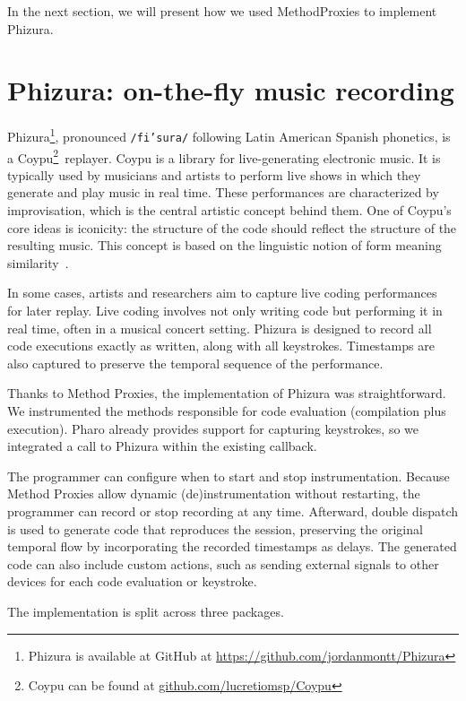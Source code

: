 \documentclass[
]{ceurart}
\begin{document}
In the next section, we will present how we used MethodProxies to implement Phizura.

\section{Phizura: on-the-fly music recording}

Phizura\footnote{Phizura is available at GitHub at \url{https://github.com/jordanmontt/Phizura}}, pronounced \texttt{/fi'su\*ra/} following Latin American Spanish phonetics, is a Coypu\footnote{Coypu can be found at \url{github.com/lucretiomsp/Coypu}}\ replayer.
Coypu is a library for live-generating electronic music.
It is typically used by musicians and artists to perform live shows in which they generate and play music in real time.
These performances are characterized by improvisation, which is the central artistic concept behind them.
One of Coypu's core ideas is iconicity: the structure of the code should reflect the structure of the resulting music.
This concept is based on the linguistic notion of form meaning similarity~\cite{Haim85a, Comr81a}.

In some cases, artists and researchers aim to capture live coding performances~\cite{Nils07a} for later replay.
Live coding involves not only writing code but performing it in real time, often in a musical concert setting.
Phizura is designed to record all code executions exactly as written, along with all keystrokes.
Timestamps are also captured to preserve the temporal sequence of the performance.

Thanks to Method Proxies, the implementation of Phizura was straightforward. 
We instrumented the methods responsible for code evaluation (compilation plus execution). 
Pharo already provides support for capturing keystrokes, so we integrated a call to Phizura within the existing callback. 

The programmer can configure when to start and stop instrumentation. 
Because Method Proxies allow dynamic (de)instrumentation without restarting, the programmer can record or stop recording at any time.
Afterward, double dispatch is used to generate code that reproduces the session, preserving the original temporal flow by incorporating the recorded timestamps as delays.
The generated code can also include custom actions, such as sending external signals to other devices for each code evaluation or keystroke.

The implementation is split across three packages.
\end{document}
